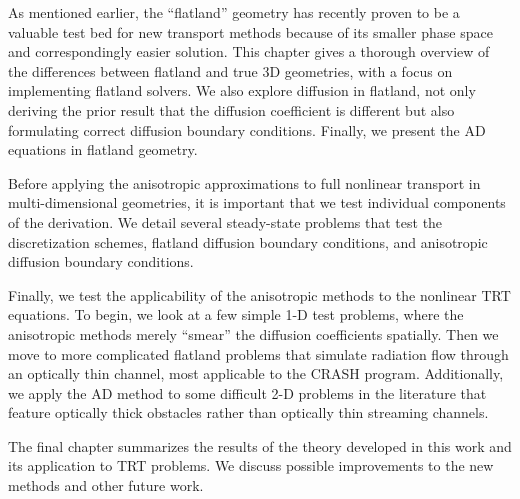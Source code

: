 As mentioned earlier, the ``flatland'' geometry has recently proven to be a
valuable test bed for new transport methods because of its smaller phase space
and correspondingly easier solution. This chapter gives a thorough overview of
the differences between flatland and true 3D geometries, with a focus on
implementing flatland solvers. We also explore diffusion in flatland, not only
deriving the prior result that the diffusion coefficient is different but also
formulating correct diffusion boundary conditions. Finally, we present the AD
equations in flatland geometry.

Before applying the anisotropic approximations to full nonlinear transport in
multi-dimensional geometries, it is important that we test individual components
of the derivation. We detail several steady-state problems that test the
discretization schemes, flatland diffusion boundary conditions, and anisotropic
diffusion boundary conditions.

Finally, we test the applicability of the anisotropic methods to the nonlinear
TRT equations. To begin, we look at a few simple 1-D test problems, where the
anisotropic methods merely ``smear'' the diffusion coefficients spatially. Then
we move to more complicated flatland problems that simulate radiation flow
through an optically thin channel, most applicable to the CRASH program.
Additionally, we apply the AD method to some difficult 2-D problems in the
literature that feature optically thick obstacles rather than optically thin
streaming channels.

The final chapter summarizes the results of the theory developed in this work
and its application to TRT problems. We discuss possible improvements to the new
methods and other future work.

